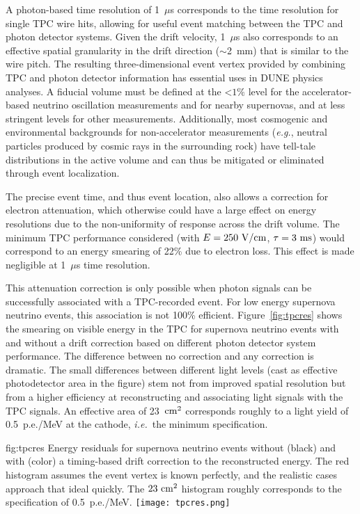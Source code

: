A photon-based time resolution of 1~$\mu$s corresponds to the 
time resolution for single TPC wire hits, allowing for useful 
event matching between the TPC and photon detector systems.  
Given the drift velocity, 1~$\mu$s also corresponds to an 
effective spatial granularity in the drift direction 
($\sim$2~mm) that is similar to the wire pitch.  The resulting 
three-dimensional event vertex provided by combining TPC and 
photon detector information has essential uses in DUNE physics 
analyses.  A fiducial volume must be defined at the 
$\mathord{<}1\%$ level for the accelerator-based neutrino 
oscillation measurements and for nearby supernovas, and at less 
stringent levels for other measurements.  Additionally, most 
cosmogenic and environmental backgrounds for non-accelerator 
measurements ({\em e.g.}, neutral particles produced by cosmic 
rays in the surrounding rock) have tell-tale distributions in the
active volume and can thus be mitigated or eliminated through 
event localization.

The precise event time, and thus event location, also allows a 
correction for electron attenuation, which otherwise could have 
a large effect on energy resolutions due to the non-uniformity
of response across the drift volume.  
The minimum TPC performance 
considered (with $E=250~\rm{V/cm}$, $\tau=3~\rm{ms}$) would 
correspond to an energy smearing of 22\% due to electron loss.  
This effect is made negligible at 1~$\mu$s time resolution.

This attenuation correction is only possible when photon signals can be successfully associated with a TPC-recorded event.  For low energy supernova neutrino events, this association is not 
100\% efficient.  Figure~\ref{fig:tpcres} shows the smearing on visible energy in the TPC for supernova neutrino events with and without a drift correction based on different photon detector system performance.  The difference between no correction and any correction is dramatic.  The small differences between different light levels (cast as effective photodetector area in the figure) stem not from improved spatial resolution but from a higher efficiency at reconstructing and associating light signals with the TPC signals.  An effective area of 23~$\rm{cm}^2$ corresponds roughly to a light yield of 0.5~p.e./MeV at the cathode, {\em i.e.}\ the minimum specification.
%
\begin{dunefigure}
{fig:tpcres}
{Energy residuals for supernova neutrino events without (black) 
and with (color) a timing-based drift correction to the 
reconstructed energy.  The red histogram assumes the event 
vertex is known perfectly, and the realistic cases approach that
ideal quickly.  The $23~\rm{cm}^2$ histogram roughly corresponds 
to the specification of 0.5~p.e./MeV.}
  \texttt{[image: tpcres.png]}
\end{dunefigure}

